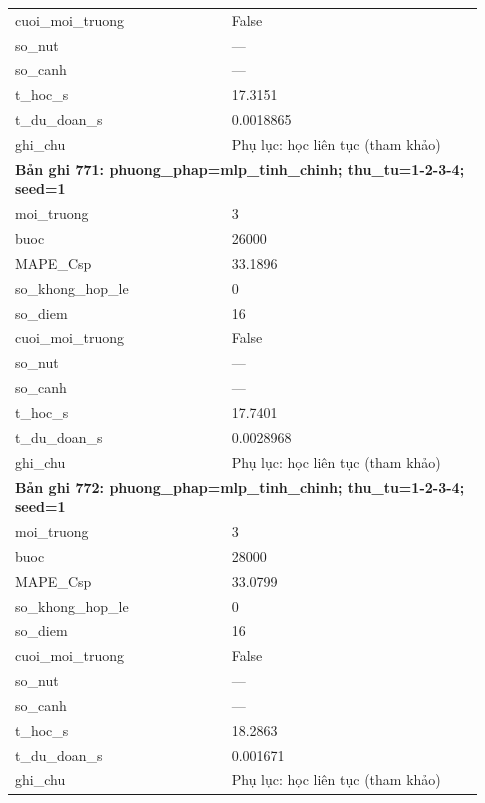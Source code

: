 \begin{longtable}{p{0.43\linewidth}p{0.50\linewidth}}
cuoi\_\allowbreak moi\_\allowbreak truong & False \\
so\_\allowbreak nut & — \\
so\_\allowbreak canh & — \\
t\_\allowbreak hoc\_\allowbreak s & 17.3151 \\
t\_\allowbreak du\_\allowbreak doan\_\allowbreak s & 0.0018865 \\
ghi\_\allowbreak chu & Phụ lục: học liên tục (tham khảo) \\
\midrule
\multicolumn{2}{p{0.95\linewidth}}{\textbf{Bản ghi 771: phuong\_phap=mlp\_tinh\_chinh; thu\_tu=1-2-3-4; seed=1}} \\
moi\_\allowbreak truong & 3 \\
buoc & 26000 \\
MAPE\_\allowbreak Csp & 33.1896 \\
so\_\allowbreak khong\_\allowbreak hop\_\allowbreak le & 0 \\
so\_\allowbreak diem & 16 \\
cuoi\_\allowbreak moi\_\allowbreak truong & False \\
so\_\allowbreak nut & — \\
so\_\allowbreak canh & — \\
t\_\allowbreak hoc\_\allowbreak s & 17.7401 \\
t\_\allowbreak du\_\allowbreak doan\_\allowbreak s & 0.0028968 \\
ghi\_\allowbreak chu & Phụ lục: học liên tục (tham khảo) \\
\midrule
\multicolumn{2}{p{0.95\linewidth}}{\textbf{Bản ghi 772: phuong\_phap=mlp\_tinh\_chinh; thu\_tu=1-2-3-4; seed=1}} \\
moi\_\allowbreak truong & 3 \\
buoc & 28000 \\
MAPE\_\allowbreak Csp & 33.0799 \\
so\_\allowbreak khong\_\allowbreak hop\_\allowbreak le & 0 \\
so\_\allowbreak diem & 16 \\
cuoi\_\allowbreak moi\_\allowbreak truong & False \\
so\_\allowbreak nut & — \\
so\_\allowbreak canh & — \\
t\_\allowbreak hoc\_\allowbreak s & 18.2863 \\
t\_\allowbreak du\_\allowbreak doan\_\allowbreak s & 0.001671 \\
ghi\_\allowbreak chu & Phụ lục: học liên tục (tham khảo) \\

\end{longtable}
